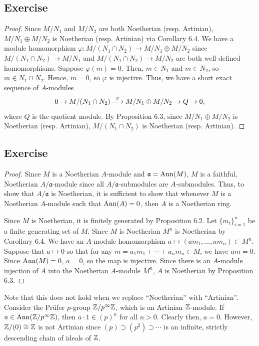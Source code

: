 \subsection{Exercise}\label{6.3}

\begin{proof}
Since $M/N_1$ and $M/N_2$ are both Noetherian (resp. Artinian), $M/N_1 \oplus M/N_2$ is Noetherian (resp. Artinian) via Corollary 6.4.
We have a module homomorphism $\varphi : M / (N_1 \cap N_2) \to M/N_1 \oplus M/N_2$ since $M / (N_1 \cap N_2) \to M/N_1$ and 
$M / (N_1 \cap N_2) \to M/N_2$ are both well-defined homomorphisms. Suppose $\varphi(m) = 0$. Then, $m \in N_1$ and $m \in N_2$, so 
$m \in N_1 \cap N_2$. Hence, $m = 0$, so $\varphi$ is injective. Thus, we have a short exact sequence of $A$-modules
$$0 \to M / (N_1 \cap N_2) \xlongrightarrow{\varphi} M/N_1 \oplus M/N_2 \to Q \to 0,$$
where $Q$ is the quotient module. By Proposition 6.3, since $M/N_1 \oplus M/N_2$ is Noetherian (resp. Artinian), $M / (N_1 \cap N_2)$
is Noetherian (resp. Artinian).
\end{proof}

\subsection{Exercise}\label{6.4}

\begin{proof}
Since $M$ is a Noetherian $A$-module and $\mathfrak{a} = \operatorname{Ann}(M)$, $M$ is a faithful, Noetherian $A/\mathfrak{a}$-module since all 
$A/\mathfrak{a}$-submodules are $A$-submodules. Thus, to show that $A/\mathfrak{a}$ is Noetherian, it is sufficient to show that
whenever $M$ is a Noetherian $A$-module such that $\operatorname{Ann}(A) = 0$, then $A$ is a Noetherian ring.

Since $M$ is Noetherian, it is finitely generated by Proposition 6.2. Let $\{m_i\}_{i=1}^n$ be a finite generating set of $M$. Since $M$ is Noetherian
$M^n$ is Noetherian by Corollary 6.4. We have an $A$-module homomorphism $a \mapsto (a m_1, \ldots, a m_n) \subset M^n$. Suppose that $a \mapsto 0$ so that 
for any $m = a_1 m_1 + \cdots + a_n m_n \in M$, we have $a m = 0$. Since $\operatorname{Ann}(M) = 0$, $a = 0$, so the map is injective. Since there is an $A$-module injection
of $A$ into the Noetherian $A$-module $M^n$, $A$ is Noetherian by Proposition 6.3.
\end{proof}

\begin{remark}
Note that this does not hold when we replace ``Noetherian'' with ``Artinian''. Consider the Pr\"ufer $p$-group $\mathbb{Z}/p^{\infty}\mathbb{Z}$, which is an 
Artinian $\mathbb{Z}$-module. If $a \in \operatorname{Ann}(\mathbb{Z}/p^{\infty}\mathbb{Z})$, then $a \cdot 1 \in (p)^n$ for all $n > 0$. Clearly then, $a = 0$. However, $\mathbb{Z}/(0) \cong \mathbb{Z}$ 
is not Artinian since $(p) \supset (p^2) \supset \cdots$ is an infinite, strictly descending chain of ideals of $\mathbb{Z}$.
\end{remark}

